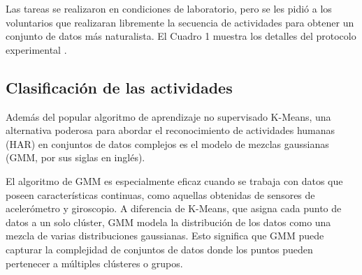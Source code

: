 \documentclass{esannV2}
\begin{document}
\begin{table}[h!]
    \centering
    \caption{Protocolo de actividades para el Experimento HAR.}
    \label{tab:har_protocol}
\end{table}

Las tareas se realizaron en condiciones de laboratorio, pero se les pidió a los voluntarios que realizaran libremente la secuencia de actividades para obtener un conjunto de datos más naturalista. El Cuadro 1 muestra los detalles del protocolo experimental \cite{esann2013}.

\subsection{Clasificación de las actividades}
Además del popular algoritmo de aprendizaje no supervisado K-Means, una alternativa poderosa para abordar el reconocimiento de actividades humanas (HAR) en conjuntos de datos complejos es el modelo de mezclas gaussianas (GMM, por sus siglas en inglés).

El algoritmo de GMM es especialmente eficaz cuando se trabaja con datos que poseen características continuas, como aquellas obtenidas de sensores de acelerómetro y giroscopio. A diferencia de K-Means, que asigna cada punto de datos a un solo clúster, GMM modela la distribución de los datos como una mezcla de varias distribuciones gaussianas. Esto significa que GMM puede capturar la complejidad de conjuntos de datos donde los puntos pueden pertenecer a múltiples clústeres o grupos.
\end{document}
